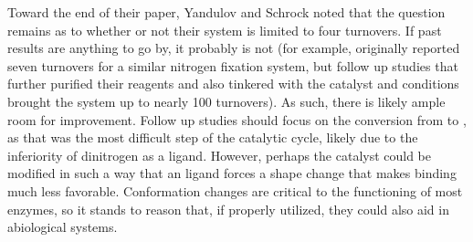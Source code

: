 \documentclass[titlepage,12pt]{article}
\begin{document}
Toward the end of their paper, Yandulov and Schrock noted that the question remains as to whether or not their system is limited to four turnovers. If past results are anything to go by, it probably is not (for example, \textcite{bib:AndersonPeters} originally reported seven turnovers for a similar nitrogen fixation system, but follow up studies that further purified their reagents and also tinkered with the catalyst and conditions brought the system up to nearly 100 turnovers). As such, there is likely ample room for improvement. Follow up studies should focus on the conversion from  to , as that was the most difficult step of the catalytic cycle, likely due to the inferiority of dinitrogen as a ligand. However, perhaps the catalyst could be modified in such a way that an  ligand forces a shape change that makes  binding much less favorable. Conformation changes are critical to the functioning of most enzymes, so it stands to reason that, if properly utilized, they could also aid in abiological systems.
\newpage



\printbibliography
\end{document}
